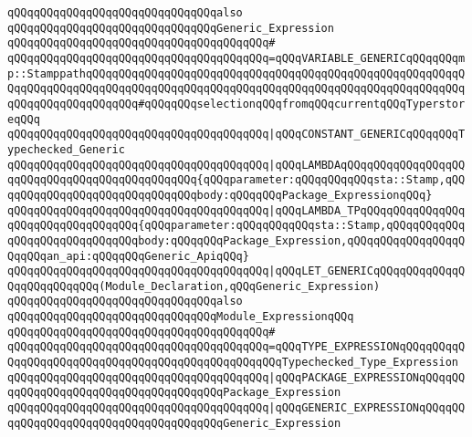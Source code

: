\newline
\newline
\newline
\verb|qQQqqQQqqQQqqQQqqQQqqQQqqQQqqQQqalso|\newline
\verb|qQQqqQQqqQQqqQQqqQQqqQQqqQQqqQQqGeneric_Expression|\newline
\verb|qQQqqQQqqQQqqQQqqQQqqQQqqQQqqQQqqQQqqQQq#|\newline
\verb|qQQqqQQqqQQqqQQqqQQqqQQqqQQqqQQqqQQqqQQq=qQQqVARIABLE_GENERICqQQqqQQqmp::StamppathqQQqqQQqqQQqqQQqqQQqqQQqqQQqqQQqqQQqqQQqqQQqqQQqqQQqqQQqqQQqqQQqqQQqqQQqqQQqqQQqqQQqqQQqqQQqqQQqqQQqqQQqqQQqqQQqqQQqqQQqqQQqqQQqqQQqqQQqqQQqqQQqqQQq#qQQqqQQqselectionqQQqfromqQQqcurrentqQQqTyperstoreqQQq|\newline
\verb|qQQqqQQqqQQqqQQqqQQqqQQqqQQqqQQqqQQqqQQq|\verb#|qQQqCONSTANT_GENERICqQQqqQQqTypechecked_Generic#\newline
\verb|qQQqqQQqqQQqqQQqqQQqqQQqqQQqqQQqqQQqqQQq|\verb#|qQQqLAMBDAqQQqqQQqqQQqqQQqqQQqqQQqqQQqqQQqqQQqqQQqqQQqqQQq{qQQqparameter:qQQqqQQqqQQqsta::Stamp,qQQqqQQqqQQqqQQqqQQqqQQqqQQqqQQqbody:qQQqqQQqPackage_ExpressionqQQq}#\newline
\verb|qQQqqQQqqQQqqQQqqQQqqQQqqQQqqQQqqQQqqQQq|\verb#|qQQqLAMBDA_TPqQQqqQQqqQQqqQQqqQQqqQQqqQQqqQQqqQQq{qQQqparameter:qQQqqQQqqQQqsta::Stamp,qQQqqQQqqQQqqQQqqQQqqQQqqQQqqQQqbody:qQQqqQQqPackage_Expression,qQQqqQQqqQQqqQQqqQQqqQQqan_api:qQQqqQQqGeneric_ApiqQQq}#\newline
\verb|qQQqqQQqqQQqqQQqqQQqqQQqqQQqqQQqqQQqqQQq|\verb#|qQQqLET_GENERICqQQqqQQqqQQqqQQqqQQqqQQqqQQq(Module_Declaration,qQQqGeneric_Expression)#\newline
\newline
\newline
\newline
\verb|qQQqqQQqqQQqqQQqqQQqqQQqqQQqqQQqalso|\newline
\verb|qQQqqQQqqQQqqQQqqQQqqQQqqQQqqQQqModule_ExpressionqQQq|\newline
\verb|qQQqqQQqqQQqqQQqqQQqqQQqqQQqqQQqqQQqqQQq#|\newline
\verb|qQQqqQQqqQQqqQQqqQQqqQQqqQQqqQQqqQQqqQQq=qQQqTYPE_EXPRESSIONqQQqqQQqqQQqqQQqqQQqqQQqqQQqqQQqqQQqqQQqqQQqqQQqqQQqTypechecked_Type_Expression|\newline
\verb|qQQqqQQqqQQqqQQqqQQqqQQqqQQqqQQqqQQqqQQq|\verb#|qQQqPACKAGE_EXPRESSIONqQQqqQQqqQQqqQQqqQQqqQQqqQQqqQQqqQQqqQQqPackage_Expression#\newline
\verb|qQQqqQQqqQQqqQQqqQQqqQQqqQQqqQQqqQQqqQQq|\verb#|qQQqGENERIC_EXPRESSIONqQQqqQQqqQQqqQQqqQQqqQQqqQQqqQQqqQQqqQQqGeneric_Expression#\newline
